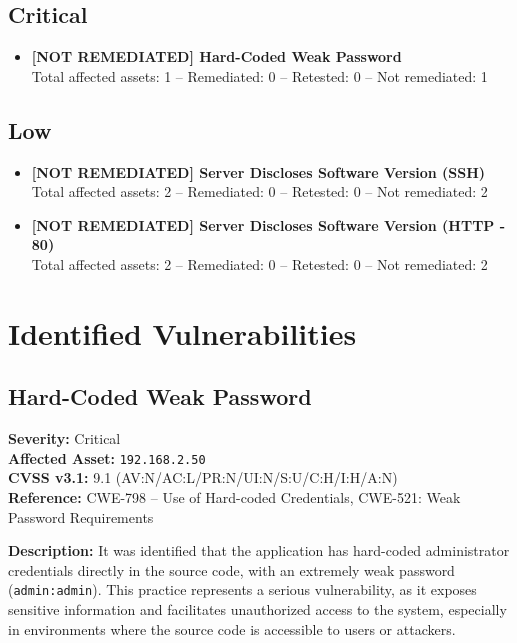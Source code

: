 \documentclass[a4paper,12pt]{article}
\begin{document}
\subsection*{\color{BrickRed}Critical}
\begin{itemize}
    \item \textbf{[NOT REMEDIATED] Hard-Coded Weak Password} \\
    Total affected assets: 1 -- Remediated: 0 -- Retested: 0 -- Not remediated: 1
\end{itemize}

\subsection*{\color{NavyBlue}Low}
\begin{itemize}
    \item \textbf{[NOT REMEDIATED] Server Discloses Software Version (SSH)} \\
    Total affected assets: 2 -- Remediated: 0 -- Retested: 0 -- Not remediated: 2
    \item \textbf{[NOT REMEDIATED] Server Discloses Software Version (HTTP - 80)} \\
    Total affected assets: 2 -- Remediated: 0 -- Retested: 0 -- Not remediated: 2
\end{itemize}

\clearpage

\section{Identified Vulnerabilities}

\subsection{Hard-Coded Weak Password}
\textbf{Severity:} \textcolor{BrickRed}{Critical} \\
\textbf{Affected Asset:} \texttt{192.168.2.50} \\
\textbf{CVSS v3.1:} 9.1 (AV:N/AC:L/PR:N/UI:N/S:U/C:H/I:H/A:N) \\
\textbf{Reference:} CWE-798 – Use of Hard-coded Credentials, CWE-521: Weak Password Requirements

\textbf{Description:}  
It was identified that the application has hard-coded administrator credentials directly in the source code, with an extremely weak password (\texttt{admin:admin}). This practice represents a serious vulnerability, as it exposes sensitive information and facilitates unauthorized access to the system, especially in environments where the source code is accessible to users or attackers.
\end{document}
